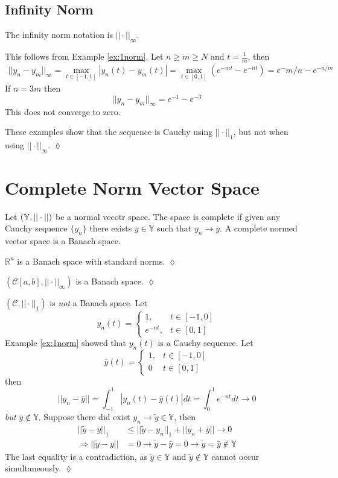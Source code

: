 \subsection{Infinity Norm}
The infinity norm notation is $||\cdot||_\infty$.
\begin{example}
This follows from Example \ref{ex:1norm}. Let $n\geq m\geq N$ and $t=\frac{1}{m}$, then
\begin{align*}
||y_n-y_m||_\infty = \max_{t\in[-1,1]}|y_n(t)-y_m(t)| = \max_{t\in[0,1]}(e^{-mt}-e^{-nt}) = e^-{m/n}-e^{-n/m}
\end{align*}
If $n=3m$ then
$$||y_n-y_m||_\infty = e^{-1}-e^{-3}$$
This does not converge to zero.

These examples show that the sequence is Cauchy using $||\cdot||_1$, but not when using $||\cdot||_\infty$.
$\lozenge$
\end{example}

\section{Complete Norm Vector Space}
\begin{definition}
Let $(\mathbb{Y},||\cdot||)$ be a normal vecotr space. The space is complete if given any Cauchy sequence $\{y_n\}$ there exists $\bar{y}\in\mathbb{Y}$ such that $y_n\to\bar{y}$. A complete normed vector space is a Banach space.
\end{definition}

\begin{example}
$\mathbb{R}^n$ is a Banach space with standard norms.
$\lozenge$
\end{example}

\begin{example}
$(\mathcal{C}[a,b],||\cdot||_\infty)$ is a Banach space.
$\lozenge$
\end{example}

\begin{example}
$(\mathcal{C},||\cdot||_1)$ is \textit{not} a Banach space. Let
$$y_n(t) = \begin{cases} 1, & t\in[-1,0] \\ e^{-nt}, & t\in[0,1] \end{cases}$$
Example \ref{ex:1norm} showed that $y_n(t)$ is a Cauchy sequence. Let
$$\bar{y}(t) = \begin{cases} 1, & t\in[-1,0] \\ 0 & t\in[0,1] \end{cases}$$
then
$$||y_n-\bar{y}|| = \int_{-1}^1|y_n(t)-\bar{y}(t)|dt = \int_0^1e^{-nt}dt\to 0$$
\textit{but} $\bar{y}\notin\mathbb{Y}$. Suppose there did exist $y_n\to\tilde{y}\in\mathbb{Y}$, then
\begin{align*}
||\tilde{y}-\bar{y}||_1 &\leq ||\tilde{y}-y_n||_1+||y_n+\bar{y}||\to 0 \\
\Rightarrow ||\tilde{y}-y|| &= 0 \to \tilde{y}-\bar{y}=0 \to \tilde{y}=\bar{y}\notin\mathbb{Y}
\end{align*}
The last equality is a contradiction, as $\tilde{y}\in\mathbb{Y}$ and $\tilde{y}\notin\mathbb{Y}$ cannot occur simultaneously.
$\lozenge$
\end{example}

